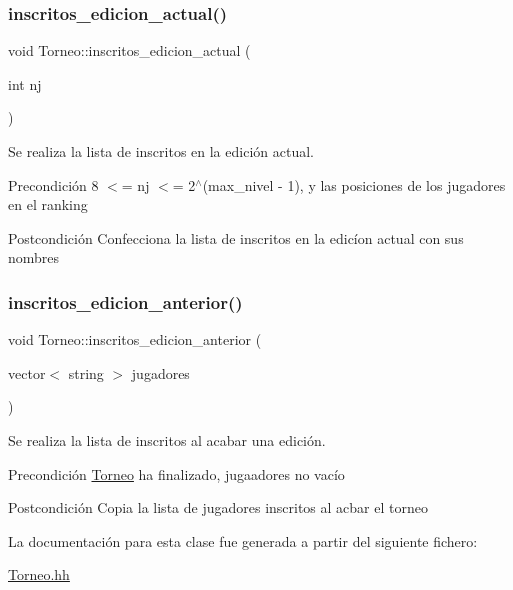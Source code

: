 \subsubsection{\texorpdfstring{inscritos\+\_\+edicion\+\_\+actual()}{inscritos\_edicion\_actual()}}
{\footnotesize\ttfamily void Torneo\+::inscritos\+\_\+edicion\+\_\+actual (\begin{DoxyParamCaption}\item[{int}]{nj }\end{DoxyParamCaption})}



Se realiza la lista de inscritos en la edición actual. 

\begin{DoxyPrecond}{Precondición}
8 $<$= nj $<$= 2$^\wedge$(max\+\_\+nivel -\/ 1), y las posiciones de los jugadores en el ranking 
\end{DoxyPrecond}
\begin{DoxyPostcond}{Postcondición}
Confecciona la lista de inscritos en la edicíon actual con sus nombres 
\end{DoxyPostcond}
\mbox{\label{class_torneo_ac1fd79d2aa1de8c3a3f29355b21c2ecb}} 
\subsubsection{\texorpdfstring{inscritos\+\_\+edicion\+\_\+anterior()}{inscritos\_edicion\_anterior()}}
{\footnotesize\ttfamily void Torneo\+::inscritos\+\_\+edicion\+\_\+anterior (\begin{DoxyParamCaption}\item[{vector$<$ string $>$}]{jugadores }\end{DoxyParamCaption})}



Se realiza la lista de inscritos al acabar una edición. 

\begin{DoxyPrecond}{Precondición}
\hyperlink{class_torneo}{Torneo} ha finalizado, jugaadores no vacío 
\end{DoxyPrecond}
\begin{DoxyPostcond}{Postcondición}
Copia la lista de jugadores inscritos al acbar el torneo 
\end{DoxyPostcond}


La documentación para esta clase fue generada a partir del siguiente fichero\+:\begin{DoxyCompactItemize}
\item 
\hyperlink{_torneo_8hh}{Torneo.\+hh}\end{DoxyCompactItemize}
